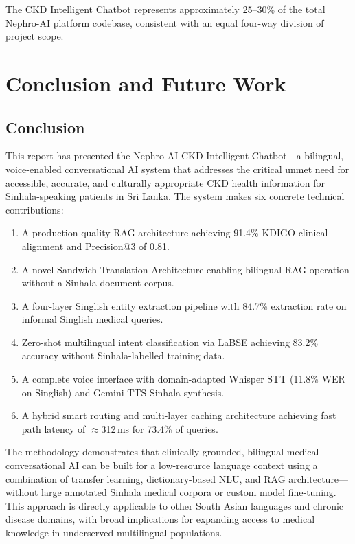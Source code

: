 \documentclass[12pt,a4paper]{report}
\begin{document}
The CKD Intelligent Chatbot represents approximately 25--30\% of the total Nephro-AI platform codebase, consistent with an equal four-way division of project scope.

\chapter{Conclusion and Future Work}
\label{chap:conclusion}

\section{Conclusion}

This report has presented the Nephro-AI CKD Intelligent Chatbot---a bilingual, voice-enabled conversational AI system that addresses the critical unmet need for accessible, accurate, and culturally appropriate CKD health information for Sinhala-speaking patients in Sri Lanka. The system makes six concrete technical contributions:

\begin{enumerate}
  \item A production-quality RAG architecture achieving 91.4\% KDIGO clinical alignment and Precision@3 of 0.81.
  \item A novel Sandwich Translation Architecture enabling bilingual RAG operation without a Sinhala document corpus.
  \item A four-layer Singlish entity extraction pipeline with 84.7\% extraction rate on informal Singlish medical queries.
  \item Zero-shot multilingual intent classification via LaBSE achieving 83.2\% accuracy without Sinhala-labelled training data.
  \item A complete voice interface with domain-adapted Whisper STT (11.8\% WER on Singlish) and Gemini TTS Sinhala synthesis.
  \item A hybrid smart routing and multi-layer caching architecture achieving fast path latency of $\approx$312\,ms for 73.4\% of queries.
\end{enumerate}

The methodology demonstrates that clinically grounded, bilingual medical conversational AI can be built for a low-resource language context using a combination of transfer learning, dictionary-based NLU, and RAG architecture---without large annotated Sinhala medical corpora or custom model fine-tuning. This approach is directly applicable to other South Asian languages and chronic disease domains, with broad implications for expanding access to medical knowledge in underserved multilingual populations.
\end{document}
